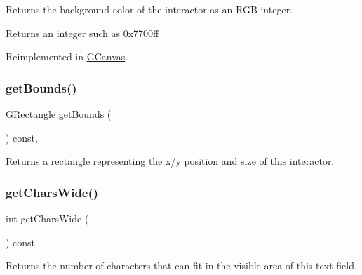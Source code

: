 Returns the background color of the interactor as an R\+GB integer. 

\begin{DoxyReturn}{Returns}
an integer such as 0x7700ff 
\end{DoxyReturn}


Reimplemented in \mbox{\hyperlink{classsgl_1_1GCanvas_acd4f2b3b9619dacdfd71fc0004cac382}{G\+Canvas}}.

\mbox{\label{classsgl_1_1GInteractor_a29e6ac35a0b48f491a4c88194cc5da3b}} 
\subsubsection{\texorpdfstring{get\+Bounds()}{getBounds()}}
{\footnotesize\ttfamily \mbox{\hyperlink{structsgl_1_1GRectangle}{G\+Rectangle}} get\+Bounds (\begin{DoxyParamCaption}{ }\end{DoxyParamCaption}) const\hspace{0.3cm}{\ttfamily [virtual]}, {\ttfamily [inherited]}}



Returns a rectangle representing the x/y position and size of this interactor. 

\mbox{\label{classsgl_1_1GTextField_acccdf98a090bca28752d04519a8b1a28}} 
\subsubsection{\texorpdfstring{get\+Chars\+Wide()}{getCharsWide()}}
{\footnotesize\ttfamily int get\+Chars\+Wide (\begin{DoxyParamCaption}{ }\end{DoxyParamCaption}) const\hspace{0.3cm}{\ttfamily [virtual]}}



Returns the number of characters that can fit in the visible area of this text field. 

\mbox{\label{classsgl_1_1GInteractor_aa061dfa488c31e18549d64363c1d0e34}} 
